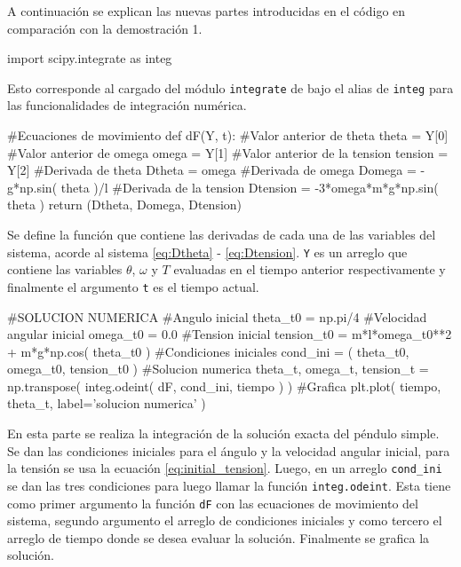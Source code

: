 A continuación se explican las nuevas partes introducidas en el código en 
comparación con la demostración 1.


\begin{listing}[style=python, numbers = none]
import scipy.integrate as integ
\end{listing}
Esto corresponde al cargado del módulo \texttt{integrate} de \scipy bajo el
alias de \texttt{integ} para las funcionalidades de integración numérica.


\begin{listing}[style=python, numbers = none]
#Ecuaciones de movimiento
def dF(Y, t):
    #Valor anterior de theta
    theta = Y[0]
    #Valor anterior de omega
    omega = Y[1]
    #Valor anterior de la tension
    tension = Y[2]
    #Derivada de theta
    Dtheta = omega
    #Derivada de omega
    Domega = -g*np.sin( theta )/l
    #Derivada de la tension
    Dtension = -3*omega*m*g*np.sin( theta )
    return (Dtheta, Domega, Dtension)
\end{listing}
Se define la función que contiene las derivadas de cada una de las 
variables del sistema, acorde al sistema \ref{eq:Dtheta} - \ref{eq:Dtension}.
\texttt{Y} es un arreglo que contiene las variables $\theta$, $\omega$ y $T$
evaluadas en el tiempo anterior respectivamente y finalmente el argumento 
\texttt{t} es el tiempo actual.


\begin{listing}[style=python, numbers = none]
#SOLUCION NUMERICA
#Angulo inicial
theta_t0 = np.pi/4
#Velocidad angular inicial
omega_t0 = 0.0
#Tension inicial
tension_t0 = m*l*omega_t0**2 + m*g*np.cos( theta_t0 )
#Condiciones iniciales
cond_ini = ( theta_t0, omega_t0, tension_t0 )
#Solucion numerica
theta_t, omega_t, tension_t = np.transpose( 
integ.odeint( dF, cond_ini, tiempo ) )
#Grafica
plt.plot( tiempo, theta_t, label='solucion numerica' )
\end{listing}
En esta parte se realiza la integración de la solución exacta del péndulo 
simple. Se dan las condiciones iniciales para el ángulo y la velocidad 
angular inicial, para la tensión se usa la ecuación \ref{eq:initial_tension}.
Luego, en un arreglo \texttt{cond\_ini} se dan las tres condiciones para 
luego llamar la función \texttt{integ.odeint}. Esta tiene como primer 
argumento la función \texttt{dF} con las ecuaciones de movimiento del 
sistema, segundo argumento el arreglo de condiciones iniciales y 
como tercero el arreglo de tiempo donde se desea evaluar la solución.
Finalmente se grafica la solución.

